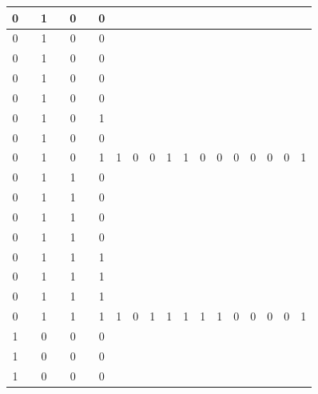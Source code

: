 \begin{table}[!tb]
\begin{tabular}{|c|c|c|c|c|c|c|c|c|c|c|c|c|c|c|c|c|c|c|}
        \rowcolor{red!40} 0 &  & 1 &  & 0 &  & 0 &  &  &  &  &  &  &  &  &  &  &  &  \\ \hline
        \rowcolor{red!40} 0 &  & 1 &  & 0 &  & 0 &  &  &  &  &  &  &  &  &  &  &  &  \\ \hline
        \rowcolor{red!40} 0 &  & 1 &  & 0 &  & 0 &  &  &  &  &  &  &  &  &  &  &  &  \\ \hline
        \rowcolor{red!40} 0 &  & 1 &  & 0 &  & 0 &  &  &  &  &  &  &  &  &  &  &  &  \\ \hline
        \rowcolor{red!40} 0 &  & 1 &  & 0 &  & 0 &  &  &  &  &  &  &  &  &  &  &  &  \\ \hline
        \rowcolor{red!40} 0 &  & 1 &  & 0 &  & 1 &  &  &  &  &  &  &  &  &  &  &  &  \\ \hline
        \rowcolor{red!40} 0 &  & 1 &  & 0 &  & 0 &  &  &  &  &  &  &  &  &  &  &  &  \\ \hline
        \rowcolor{red!40} 0 &  & 1 &  & 0 &  & 1 & 1 & 0 & 0 & 1 & 1 & 0 & 0 & 0 & 0 & 0 & 0 & 1 \\ \hline
        \rowcolor{green!40} 0 &  & 1 &  & 1 &  & 0 &  &  &  &  &  &  &  &  &  &  &  &  \\ \hline
        \rowcolor{green!40} 0 &  & 1 &  & 1 &  & 0 &  &  &  &  &  &  &  &  &  &  &  &  \\ \hline
        \rowcolor{green!40} 0 &  & 1 &  & 1 &  & 0 &  &  &  &  &  &  &  &  &  &  &  &  \\ \hline
        \rowcolor{green!40} 0 &  & 1 &  & 1 &  & 0 &  &  &  &  &  &  &  &  &  &  &  &  \\ \hline
        \rowcolor{green!40} 0 &  & 1 &  & 1 &  & 1 &  &  &  &  &  &  &  &  &  &  &  &  \\ \hline
        \rowcolor{green!40} 0 &  & 1 &  & 1 &  & 1 &  &  &  &  &  &  &  &  &  &  &  &  \\ \hline
        \rowcolor{green!40} 0 &  & 1 &  & 1 &  & 1 &  &  &  &  &  &  &  &  &  &  &  &  \\ \hline
        \rowcolor{green!40} 0 &  & 1 &  & 1 &  & 1 & 1 & 0 & 1 & 1 & 1 & 1 & 1 & 0 & 0 & 0 & 0 & 1 \\ \hline
        \rowcolor{yellow!40} 1 &  & 0 &  & 0 &  & 0 &  &  &  &  &  &  &  &  &  &  &  &  \\ \hline
        \rowcolor{yellow!40} 1 &  & 0 &  & 0 &  & 0 &  &  &  &  &  &  &  &  &  &  &  &  \\ \hline
        \rowcolor{yellow!40} 1 &  & 0 &  & 0 &  & 0 &  &  &  &  &  &  &  &  &  &  &  &  \\ \hline

\end{tabular}
\end{table}
